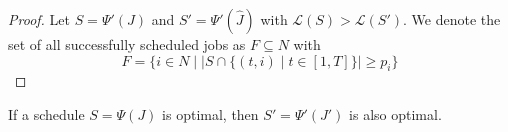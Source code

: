 \begin{proof}

    Let $S = \Psi'(J)$ and ${S}' = \Psi'(\hat{J})$ with $\mathcal{L}(S) > \mathcal{L}({S}')$. 
    We denote the set of all successfully scheduled jobs as $F\subseteq N$ with 
    \begin{equation*}
        F = \{i\in N \mid |S \cap \{(t, i) \mid t\in [1, T]\}| \geq p_i\}
    \end{equation*}

\end{proof}


\begin{theorem}
    If a schedule $S = \Psi(J)$ is optimal, then $S'=\Psi'(J')$ is also optimal. 
\end{theorem}